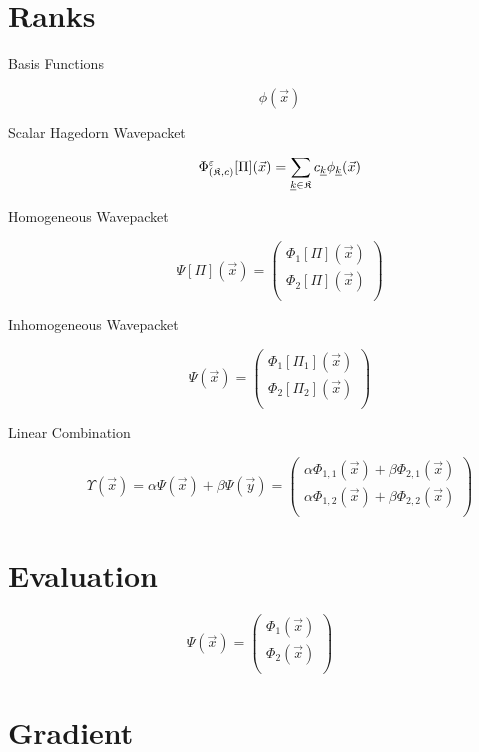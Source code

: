\documentclass{article}
\begin{document}
\section{Ranks}

\begin{description}
\item[Basis Functions]
  \[ \phi(\vec{x}) \]
\item[Scalar Hagedorn Wavepacket]
  \[ \Phi^\varepsilon_{(\mathfrak{K},c)}[\Pi](\vec{x}) = \sum_{\underline{k} \in \mathfrak{K}}
    c_{\underline{k}}\phi_{\underline{k}}(\vec{x}) \]
\item[Homogeneous Wavepacket]
  \[
    \Psi[\Pi](\vec{x}) =
    \begin{pmatrix}
      \Phi_1[\Pi](\vec{x}) \\
      \Phi_2[\Pi](\vec{x}) \\
    \end{pmatrix}
  \]
\item[Inhomogeneous Wavepacket]
  \[
    \Psi(\vec{x}) =
    \begin{pmatrix}
      \Phi_1[\Pi_1](\vec{x}) \\
      \Phi_2[\Pi_2](\vec{x}) \\
    \end{pmatrix}
  \]
\item[Linear Combination]
  \[
    \Upsilon(\vec{x}) = \alpha \Psi(\vec{x}) + \beta \Psi(\vec{y}) = 
    \begin{pmatrix}
      \alpha \Phi_{1,1}(\vec{x}) + \beta \Phi_{2,1}(\vec{x}) \\
      \alpha \Phi_{1,2}(\vec{x}) + \beta \Phi_{2,2}(\vec{x}) \\
    \end{pmatrix}
  \]
\end{description}


\section{Evaluation}

\[
  \Psi(\vec{x}) =
  \begin{pmatrix}
    \Phi_1(\vec{x}) \\
    \Phi_2(\vec{x}) \\
  \end{pmatrix}
\]

\section{Gradient}
\end{document}
